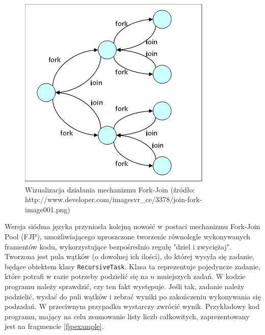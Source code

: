 \documentclass[12pt]{extarticle}
\begin{document}
\begin{figure}[h]
\centering
\includegraphics{forkjoin.png}
\caption{Wizualizacja działania mechanizmu Fork-Join (źródło: http://www.developer.com/imagesvr\_ce/3378/join-fork-image001.png)}
\label{fig:forkjoin}
\end{figure}

    Wersja siódma języka przyniosła kolejną nowość w postaci mechanizmu Fork-Join Pool (FJP), umożliwiającego uproszczone tworzenie równolegle wykonywanych framentów kodu, wykorzystujące bezpośrednio regułę "dziel i zwyciężaj". Tworzona jest pula wątków (o dowolnej ich ilości), do której wysyła się zadanie, będące obiektem klasy \texttt{RecursiveTask}. Klasa ta reprezentuje pojedyncze zadanie, które potrafi w razie potrzeby podzielić się na $ n $ mniejszych zadań. W kodzie programu należy sprawdzić, czy ten fakt występuje. Jeśli tak, zadanie należy podzielić, wysłać do puli wątków i zebrać wyniki po zakończeniu wykonywania się podzadań. W przeciwnym przypadku wystarczy zwrócić wynik. Przykładowy kod programu, mający na celu zsumowanie listy liczb całkowitych, zaprezentowany jest na fragmencie \ref{fjpexample}.
\end{document}
